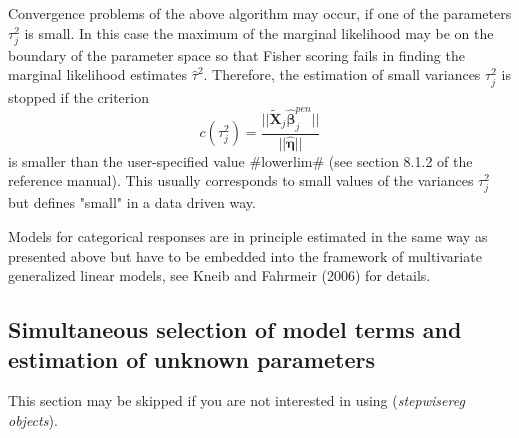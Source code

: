 \documentclass[11pt,a4paper,twoside]{bayesxarticle}
\def \betavec {\boldsymbol{\beta}}
\def \etavec {\boldsymbol{\eta}}
\def \Xvec {\mathbf{X}}
\begin{document}
Convergence problems of the above algorithm may occur, if one of the
parameters $\tau_j^2$ is small. In this case the maximum of the
marginal likelihood may be on the boundary of the parameter space so
that Fisher scoring fails in finding the marginal likelihood
estimates $\hat{\tau}^2$. Therefore, the estimation of small
variances $\tau_j^2$ is stopped if the criterion
\begin{equation}\label{remlstopcrit}
 c(\tau_j^2)=\frac{||\tilde{\Xvec}_j\hat{\betavec}_j^{pen}||}{||\hat{\etavec}||}
\end{equation}
is smaller than the user-specified value #lowerlim# (see section
8.1.2 of the reference manual). This usually corresponds to small
values of the variances $\tau_j^2$ but defines "small" in a data
driven way.

Models for categorical responses are in principle estimated in the
same way as presented above but have to be embedded into the
framework of multivariate generalized linear models, see Kneib and
Fahrmeir (2006) for details.

\subsection{Simultaneous selection of model terms and estimation of unknown parameters}
\label{stepwiseest}
 

This section may be skipped if you are not interested in using ({\em stepwisereg objects}).
\end{document}
